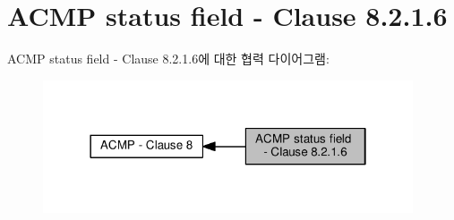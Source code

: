 \hypertarget{group__acmp__status}{}\section{A\+C\+MP status field -\/ Clause 8.2.1.6}
\label{group__acmp__status}
A\+C\+MP status field -\/ Clause 8.2.1.6에 대한 협력 다이어그램\+:
\nopagebreak
\begin{figure}[H]
\begin{center}
\leavevmode
\includegraphics[width=310pt]{group__acmp__status}
\end{center}
\end{figure}
